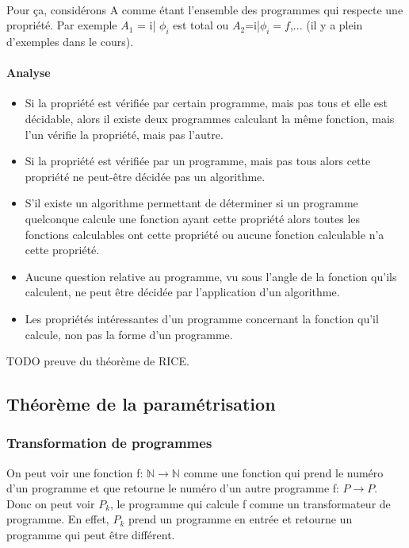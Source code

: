 \documentclass[11pt,a4paper]{article}
\newcommand{\N}{\mathbb{N}}
\theoremstyle{definition}
\begin{document}
\paragraph{}Pour ça, considérons A comme étant l'ensemble des programmes qui 
respecte une propriété. Par exemple $A_1$ = {i| $\phi_i$ est total} ou 
$A_2$={i|$\phi_i = f$},... (il y a plein d'exemples dans le cours).

\paragraph{Analyse} 
\begin{itemize}
	\item Si la propriété est vérifiée par certain programme, mais pas tous 
		et elle est décidable, alors il existe deux programmes calculant la 
		même fonction, mais l'un vérifie la propriété, mais pas l'autre.

	\item Si la propriété est vérifiée par un programme, mais pas tous 
		alors cette propriété ne peut-être décidée pas un algorithme.

	\item S'il existe un algorithme permettant de déterminer si un 
		programme quelconque calcule une fonction ayant cette propriété 
		alors toutes les fonctions calculables ont cette propriété ou 
		aucune fonction calculable n'a cette propriété.
	\item Aucune question relative au programme, vu sous l'angle de la 
		fonction qu'ils calculent, ne peut être décidée par 
		l'application d'un algorithme.
	\item Les propriétés intéressantes d'un programme concernant la 
		fonction qu'il calcule, non pas la forme d'un programme.
\end{itemize}

TODO preuve du théorème de RICE.



\subsection{Théorème de la paramétrisation}
\label{sub:th_or_me_de_la_param_trisation}

\subsubsection{Transformation de programmes}
\label{ssub:transformation_de_programmes}
On peut voir une fonction f: $\N \rightarrow \N$ comme une fonction qui prend 
le numéro d'un programme et que retourne le numéro d'un autre programme f: $P 
\rightarrow P$. Donc on peut voir $P_k$, le programme qui calcule f comme un 
transformateur de programme. En effet, $P_k$ prend un programme en entrée et 
retourne un programme qui peut être différent.
\end{document}
